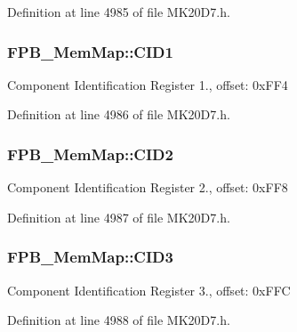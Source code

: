 Definition at line 4985 of file M\+K20\+D7.\+h.

\subsubsection[{\texorpdfstring{C\+I\+D1}{CID1}}]{ F\+P\+B\+\_\+\+Mem\+Map\+::\+C\+I\+D1}\hypertarget{struct_f_p_b___mem_map_a252a9bf3bd58aa080c9058f8acbc9dd0}{}\label{struct_f_p_b___mem_map_a252a9bf3bd58aa080c9058f8acbc9dd0}
Component Identification Register 1., offset\+: 0x\+F\+F4 

Definition at line 4986 of file M\+K20\+D7.\+h.

\subsubsection[{\texorpdfstring{C\+I\+D2}{CID2}}]{ F\+P\+B\+\_\+\+Mem\+Map\+::\+C\+I\+D2}\hypertarget{struct_f_p_b___mem_map_a682979a59af5457d6c388fb11274fd9a}{}\label{struct_f_p_b___mem_map_a682979a59af5457d6c388fb11274fd9a}
Component Identification Register 2., offset\+: 0x\+F\+F8 

Definition at line 4987 of file M\+K20\+D7.\+h.

\subsubsection[{\texorpdfstring{C\+I\+D3}{CID3}}]{ F\+P\+B\+\_\+\+Mem\+Map\+::\+C\+I\+D3}\hypertarget{struct_f_p_b___mem_map_a75c3b9a038df70053d980c6ee3d2d821}{}\label{struct_f_p_b___mem_map_a75c3b9a038df70053d980c6ee3d2d821}
Component Identification Register 3., offset\+: 0x\+F\+FC 

Definition at line 4988 of file M\+K20\+D7.\+h.

